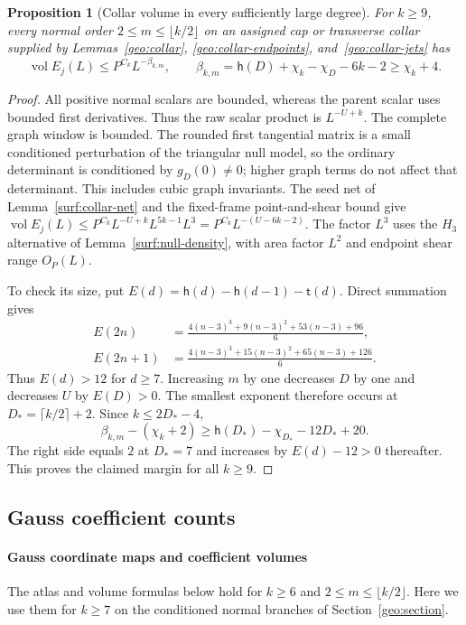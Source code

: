\documentclass[11pt]{amsart}
\newtheorem{proposition}[theorem]{Proposition}
\theoremstyle{definition}
\theoremstyle{remark}
\numberwithin{equation}{section}
\begin{document}
\begin{proposition}[Collar volume in every sufficiently large degree]\label{surf:collar-tail}
For $k\ge9$, every normal order $2\le m\le\lfloor k/2\rfloor$ on an assigned cap or transverse collar supplied by Lemmas~\ref{geo:collar}, \ref{geo:collar-endpoints}, and~\ref{geo:collar-jets} has
\[
 \operatorname{vol}E_j(L)\le P^{C_k}L^{-\beta_{k,m}},\qquad \beta_{k,m}=\mathsf{h}(D)+\chi_k-\chi_D-6k-2\ge\chi_k+4.
\]
\end{proposition}
\begin{proof}
All positive normal scalars are bounded, whereas the parent scalar uses bounded first derivatives. Thus the raw scalar product is $L^{-U+k}$. The complete graph window is bounded. The rounded first tangential matrix is a small conditioned perturbation of the triangular null model, so the ordinary determinant is conditioned by $g_D(0)\ne0$; higher graph terms do not affect that determinant. This includes cubic graph invariants. The seed net of Lemma~\ref{surf:collar-net} and the fixed-frame point-and-shear bound give $\operatorname{vol}E_j(L)\le P^{C_k}L^{-U+k}L^{5k-1}L^3=P^{C_k}L^{-(U-6k-2)}$. The factor $L^3$ uses the $H_3$ alternative of Lemma~\ref{surf:null-density}, with area factor $L^2$ and endpoint shear range $O_P(L)$.

To check its size, put $E(d)=\mathsf{h}(d)-\mathsf{h}(d-1)-\mathsf{t}(d)$. Direct summation gives
\[
\begin{aligned}
E(2n)&=\frac{4(n-3)^3+9(n-3)^2+53(n-3)+96}{6},\\
E(2n+1)&=\frac{4(n-3)^3+15(n-3)^2+65(n-3)+126}{6}.
\end{aligned}
\]
Thus $E(d)>12$ for $d\ge7$. Increasing $m$ by one decreases $D$ by one and decreases $U$ by $E(D)>0$. The smallest exponent therefore occurs at $D_* =\lceil k/2\rceil+2$. Since $k\le2D_*-4$,
\[
 \beta_{k,m}-(\chi_k+2)\ge \mathsf{h}(D_*)-\chi_{D_*}-12D_*+20.
\]
The right side equals $2$ at $D_*=7$ and increases by $E(d)-12>0$ thereafter. This proves the claimed margin for all $k\ge9$.
\end{proof}

\subsection{Gauss coefficient counts}\label{surf:gauss-counts}

\paragraph{Gauss coordinate maps and coefficient volumes}
The atlas and volume formulas below hold for $k\ge6$ and $2\le m\le\lfloor k/2\rfloor$. Here we use them for $k\ge7$ on the conditioned normal branches of Section~\ref{geo:section}.
\end{document}

